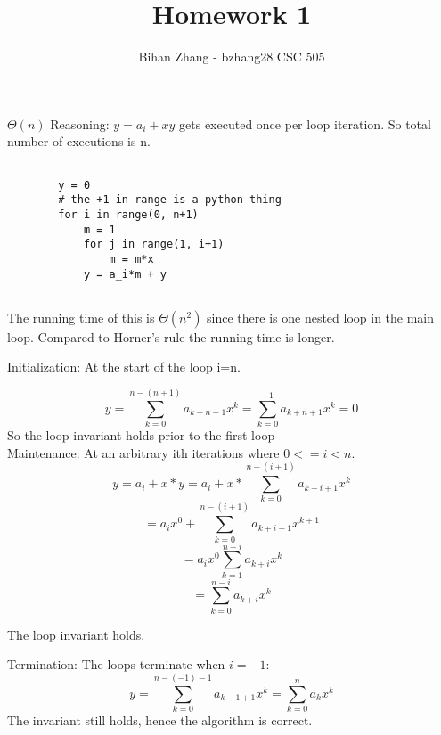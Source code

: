 \documentclass[12pt]{article}
\newenvironment{question}[2][Question]{\begin{trivlist}
		\item[\hskip \labelsep {\bfseries #1}\hskip \labelsep {\bfseries #2.}]}{\end{trivlist}}
\begin{document}
	
	
	
	\title{Homework 1}%
	\author{Bihan Zhang - bzhang28 %
		CSC 505} %
	
	\maketitle
	
	
	\begin{question}{1a} 
	$\Theta(n)$
	Reasoning: $y = a_i+ x  y$ gets executed once per loop iteration. So total number of executions is n.		
	\end{question}

	\begin{question}{1b} 
	\begin{lstlisting}
	
		y = 0
		# the +1 in range is a python thing
		for i in range(0, n+1)
			m = 1
			for j in range(1, i+1)
				m = m*x
			y = a_i*m + y 
		
	\end{lstlisting}
	
	The running time of this is $\Theta(n^2)$ since there is one nested loop in the main loop. Compared to Horner's rule the running time is longer.

	\end{question}
		
	\begin{question}{1c} 
	Initialization: At the start of the loop i=n. 

	$$y=\sum_{k=0}^{n-(n+1)}a_{k+n+1}x^k = \sum_{k=0}^{-1}a_{k+n+1}x^k = 0 $$ So the loop invariant holds prior to the first loop\\
	
	Maintenance: At an arbitrary ith iterations where $0<=i<n$.
	$$y=a_i+x*y = a_i+x*\sum_{k=0}^{n-(i+1)}a_{k+i+1}x^k$$
	$$=a_{i}x^{0}+\sum_{k=0}^{n-(i+1)}a_{k+i+1}x^{k+1}$$
	$$=a_{i}x^{0}\sum_{k=1}^{n-i}a_{k+i}x^{k}$$	
	$$=\sum_{k=0}^{n-i}a_{k+i}x^{k}$$
	
	The loop invariant holds.
	
	Termination: The loops terminate when $i=-1$:
	$$y=\sum_{k=0}^{n-(-1)-1}a_{k-1+1}x^{k}=\sum_{k=0}^{n}a_{k}x^{k}$$
	The invariant still holds, hence the algorithm is correct.
	\end{question}	
\end{document}
